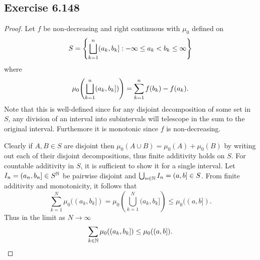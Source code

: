 \documentclass[hw_all.tex]{subfiles}
\begin{document}
\subsection{Exercise 6.148}
\begin{proof}
    Let $f$ be non-decreasing and right continuous with $\mu_0$ defined on
    \[
        S = \qty{\bigsqcup_{k=1}^n (a_k, b_k] :  -\infty \leq a_k < b_k \leq \infty}
    \]
    where
    \[
        \mu_0\qty(\bigsqcup_{k=1}^n (a_k, b_k])) = \sum_{k=1}^n f(b_k) - f(a_k)
    .\]
    Note that this is well-defined since for any disjoint decomposition of some set in $S$, any division of an interval into subintervals will telescope in the sum to the original interval. Furthemore it is monotonic since $f$ is non-decreasing.

    Clearly if $A, B \in S$ are disjoint then $\mu_0(A \cup B) = \mu_0(A) + \mu_0(B)$ by writing out each of their disjoint decompositions, thus finite additivity holds on $S$. For countable additivity in $S$, it is sufficient to show it for a single interval. Let $I_n = (a_n, b_n] \in S^{\mathbb{N}}$ be pairwise disjoint and $\bigcup_{n \in \mathbb{N}} I_n = (a,b] \in S$. From finite additivity and monotonicity, it follows that
    \[
        \sum_{k=1}^N \mu_0((a_k, b_k]) = \mu_0\left(\bigcup_{k = 1}^N (a_k, b_k]\right) \leq \mu_0((a,b])
    .\]
    Thus in the limit as $N \to \infty$
    \[
        \sum_{k \in \mathbb{N}} \mu_0((a_k, b_k]) \leq \mu_0((a,b])
    .\]
    

\end{proof}
\end{document}
